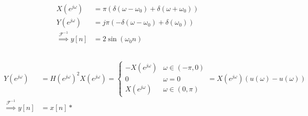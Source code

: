\documentclass{article}
\begin{document}
\begin{align}
    X(e^{j \omega}) &= \pi (\delta(\omega - \omega_0) + \delta(\omega + \omega_0)) \\
    Y(e^{j \omega}) &= j \pi (-\delta(\omega - \omega_0) + \delta(\omega_0)) \\
    \overset{\mathcal{F}^{-1}}{\implies} y[n] &= 2\sin(\omega_0 n)
\end{align}

\subsection{}

\begin{align}
    Y(e^{j \omega}) &= H(e^{j \omega})^2 X(e^{j \omega}) =
    \begin{cases}
        -X(e^{j \omega}) & \omega \in (-\pi, 0) \\
        0 & \omega = 0 \\
        X(e^{j \omega}) & \omega \in (0, \pi)
    \end{cases} = X(e^{j \omega}) (u(\omega) - u(\omega)) \\
    \overset{\mathcal{F}^{-1}}{\implies} y[n] &= x[n] \ast 
\end{align}
\end{document}
